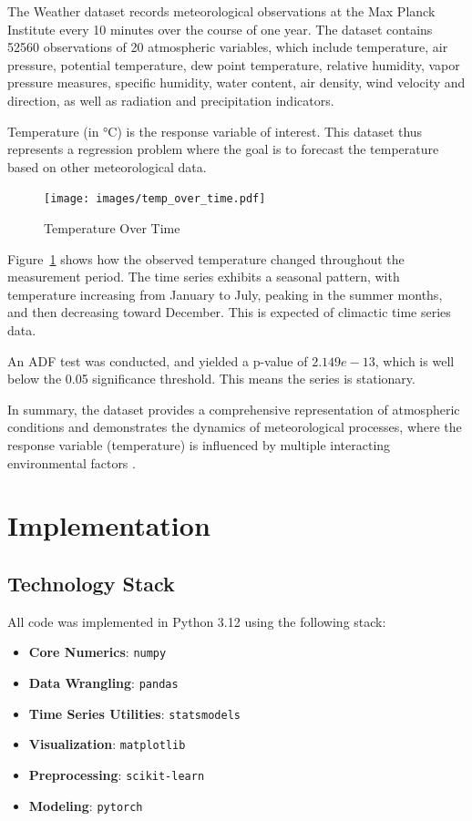 \documentclass[conference]{IEEEtran}
\begin{document}
The Weather dataset records meteorological observations at the Max Planck Institute every 10 minutes over the course of one year. The dataset contains 52560 observations of 20 atmospheric variables, which include temperature, air pressure, potential temperature, dew point temperature, relative humidity, vapor pressure measures, specific humidity, water content, air density, wind velocity and direction, as well as radiation and precipitation indicators. 

Temperature (in \si{\celsius}) is the response variable of interest. This dataset thus represents a regression problem where the goal is to forecast the temperature based on other meteorological data.

\begin{figure}[H]
    \centering
    \texttt{[image: images/temp\_over\_time.pdf]}
    \caption{Temperature Over Time}
    \label{fig:temp_over_time}
\end{figure}

Figure~\ref{fig:temp_over_time} shows how the observed temperature changed throughout the measurement period. The time series exhibits a seasonal pattern, with temperature increasing from January to July, peaking in the summer months, and then decreasing toward December. This is expected of climactic time series data.

An ADF test was conducted, and yielded a p-value of $2.149e-13$, which is well below the 0.05 significance threshold. This means the series is stationary.

In summary, the dataset provides a comprehensive representation of atmospheric conditions and demonstrates the dynamics of meteorological processes, where the response variable (temperature) is influenced by multiple interacting environmental factors \cite{weather_dataset}.

\section{\textbf{Implementation}}

\subsection{\textbf{Technology Stack}}
All code was implemented in Python 3.12 using the following stack:
\begin{itemize}
    \item \textbf{Core Numerics}: \texttt{numpy}
    \item \textbf{Data Wrangling}: \texttt{pandas}
    \item \textbf{Time Series Utilities}: \texttt{statsmodels}
    \item \textbf{Visualization}: \texttt{matplotlib}
    \item \textbf{Preprocessing}: \texttt{scikit-learn}
    \item \textbf{Modeling}: \texttt{pytorch}
\end{itemize}
\end{document}

